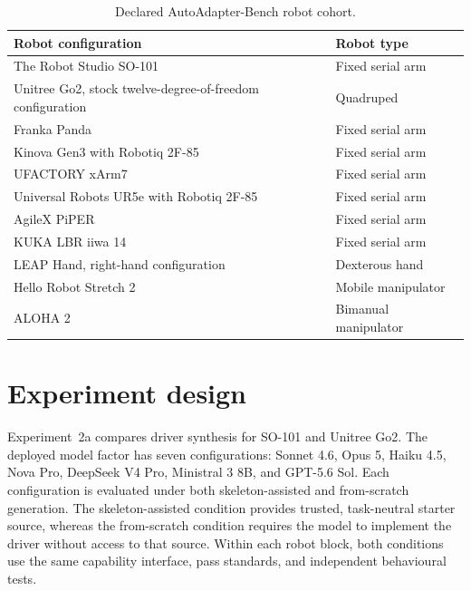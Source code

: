 \begin{table}[htbp]
  \centering
  \begingroup
  \small
  \renewcommand{\arraystretch}{1.08}
  \caption{Declared AutoAdapter-Bench robot cohort.}
  \label{tab:chapter3-robot-cohort}
  \begin{tabularx}{\textwidth}{@{}>{\raggedright\arraybackslash}p{92mm}X@{}}
    \toprule
    \textbf{Robot configuration} & \textbf{Robot type} \\
    \midrule
    The Robot Studio SO-101 & Fixed serial arm \\
    Unitree Go2, stock twelve-degree-of-freedom configuration & Quadruped \\
    Franka Panda & Fixed serial arm \\
    Kinova Gen3 with Robotiq 2F-85 & Fixed serial arm \\
    UFACTORY xArm7 & Fixed serial arm \\
    Universal Robots UR5e with Robotiq 2F-85 & Fixed serial arm \\
    AgileX PiPER & Fixed serial arm \\
    KUKA LBR iiwa 14 & Fixed serial arm \\
    LEAP Hand, right-hand configuration & Dexterous hand \\
    Hello Robot Stretch 2 & Mobile manipulator \\
    ALOHA 2 & Bimanual manipulator \\
    \bottomrule
  \end{tabularx}
  \endgroup
\end{table}



\section[Experiment design]{Experiment design}

Experiment~2a compares driver synthesis for SO-101 and Unitree Go2. The
deployed model factor has seven configurations: Sonnet 4.6, Opus 5, Haiku 4.5,
Nova Pro, DeepSeek V4 Pro, Ministral 3 8B, and GPT-5.6 Sol. Each configuration
is evaluated under both skeleton-assisted and from-scratch generation. The
skeleton-assisted condition provides trusted, task-neutral starter source,
whereas the from-scratch condition requires the model to implement the driver
without access to that source. Within each robot block, both conditions use the
same capability interface, pass standards, and independent behavioural tests.

